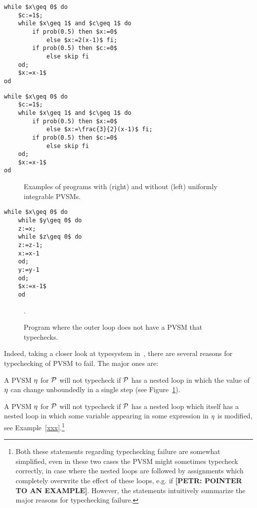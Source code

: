 \lstset{language=affprob}
\lstset{tabsize=2}
\newsavebox{\uniinto}
\begin{lrbox}{\uniinto}
\begin{lstlisting}[mathescape]
while $x\geq 0$ do
	$c:=1$;
	while $x\geq 1$ and $c\geq 1$ do
		if prob(0.5) then $x:=0$
			else $x:=2(x-1)$ fi;
		if prob(0.5) then $c:=0$ 
			else skip fi
	od;
	$x:=x-1$
od
\end{lstlisting}
\end{lrbox}
\newsavebox{\uniintt}
\begin{lrbox}{\uniintt}
	\begin{lstlisting}[mathescape]
while $x\geq 0$ do
	$c:=1$;
	while $x\geq 1$ and $c\geq 1$ do
		if prob(0.5) then $x:=0$
			else $x:=\frac{3}{2}(x-1)$ fi;
		if prob(0.5) then $c:=0$ 
			else skip fi
	od;
	$x:=x-1$
od
	\end{lstlisting}
\end{lrbox}
\begin{figure}[t]
	\usebox{\uniinto}
	\hspace{1cm}
	\usebox{\uniintt}
\label{fig:uniint}
\caption{Examples of programs with (right) and without (left) uniformly 
integrable PVSMs.}
\end{figure}

\lstset{language=affprob}
\lstset{tabsize=2}
\newsavebox{\unintthree}
\begin{lrbox}{\unintthree}
	\begin{lstlisting}[mathescape]
	while $x\geq 0$ do
	while $y\geq 0$ do
	z:=x;
	while $z\geq 0$ do
	z:=z-1;
	x:=x-1
	od;
	y:=y-1
	od;
	$x:=x-1$
	od
	\end{lstlisting}
\end{lrbox}
\begin{figure}[t]
	\usebox{\unintthree}
	\label{fig:uniint2}
	\caption{Program where the outer loop does not have a PVSM that 
		typechecks.}.
\end{figure}

Indeed, taking a closer look at typesystem in~\cite{HolgerPOPL}, there are several reasons for typechecking of PVSM to fail. The major ones are:
\begin{compactenum}
\item
A PVSM $\eta$ for \PP{} $\mathcal{P}$ will not typecheck if $\mathcal{P}$ has a 
nested loop in which the value of $\eta$ can change unboundedly in a single 
step (see Figure~\ref{fig:uniint}). 
\item
A PVSM $\eta$ for  \PP{} $\mathcal{P}$ will not typecheck if $\mathcal{P}$ has a nested loop which itself has a nested loop in which some variable appearing in some expression in $\eta$ is modified, see Example~\ref{xxx}.\footnote{Both these statements regarding typechecking failure are somewhat simplified, even in these two cases the PVSM might sometimes typecheck correctly, in case where the nested loops are followed by assignments which completely overwrite the effect of these loops, e.g. if \textbf{[PETR: POINTER TO AN EXAMPLE]}. However, the statements intuitively summarize the major reasons for typechecking failure. }
\end{compactenum}



